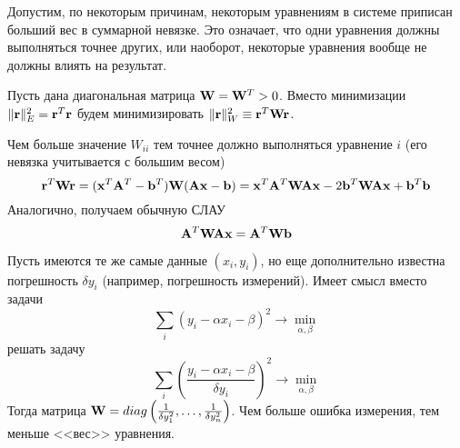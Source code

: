 \documentclass[professionalfonts,compress,unicode]{beamer}
\begin{document}
{
	Допустим, по некоторым причинам, некоторым уравнениям в системе приписан больший вес в суммарной невязке. Это означает, что 
	одни уравнения должны выполняться точнее других, или наоборот, некоторые уравнения вообще не должны влиять на результат.

	Пусть дана диагональная матрица $\mathbf{W} = \mathbf{W}^T > 0$. Вместо минимизации $\|\mathbf{r}\|_E^2 = \mathbf{r}^T\mathbf{r}$ будем 
	минимизировать $\|\mathbf{r}\|_W^2 \equiv \mathbf{r}^T\mathbf{W}\mathbf{r}$. 

	Чем больше значение $W_{ii}$ тем точнее должно выполняться уравнение $i$
	(его невязка учитывается с большим весом)
	$$
	\mathbf{r}^T \mathbf{W} \mathbf{r} = (\mathbf{x}^T\mathbf{A}^T - \mathbf{b}^T)\mathbf{W}(\mathbf{A}\mathbf{x} - \mathbf{b}) = \mathbf{x}^T\mathbf{A}^T\mathbf{W}\mathbf{A}\mathbf{x} - 2\mathbf{b}^T \mathbf{W}\mathbf{A}\mathbf{x} +\mathbf{b}^T\mathbf{b}
	$$
	Аналогично, получаем обычную СЛАУ
	$$
	\mathbf{A}^T\mathbf{W}\mathbf{A} \mathbf{x} = \mathbf{A}^T\mathbf{W}\mathbf{b}
	$$
}

{
	Пусть имеются те же самые данные $(x_i,y_i)$, но еще дополнительно известна погрешность $\delta y_i$ 
	(например, погрешность измерений). Имеет смысл вместо задачи
	$$
	\sum_i (y_i - \alpha x_i - \beta)^2 \rightarrow \min_{\alpha, \beta}
	$$
	решать задачу
	$$
	\sum_i \left(\frac{y_i - \alpha x_i - \beta}{\delta y_i}\right)^2 \rightarrow \min_{\alpha, \beta}
	$$
	Тогда матрица $\mathbf{W} = diag\left(\frac{1}{\delta y_1^2},\dots,\frac{1}{\delta
	y_n^2}\right)$.
	Чем больше ошибка измерения, тем меньше <<вес>> уравнения.
}
{
}
\end{document}
